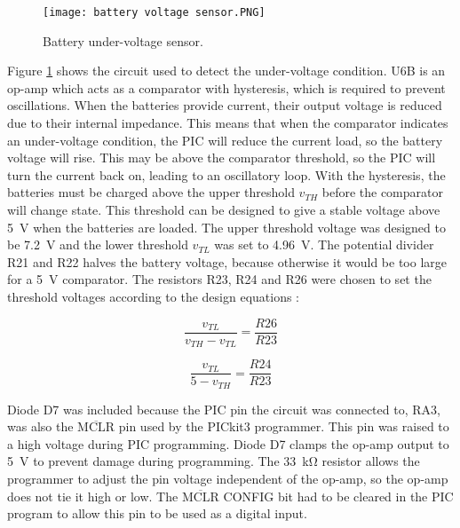 \begin{figure}[htb]
	\centering
	\texttt{[image: battery voltage sensor.PNG]}
	\caption{Battery under-voltage sensor.}
	\label{fig: battery voltage sensor}
\end{figure}

Figure \ref{fig: battery voltage sensor} shows the circuit used to detect the under-voltage condition. U6B is an op-amp which acts as a comparator with hysteresis, which is required to prevent oscillations. When the batteries provide current, their output voltage is reduced due to their internal impedance. This means that when the comparator indicates an under-voltage condition, the PIC will reduce the current load, so the battery voltage will rise. This may be above the comparator threshold, so the PIC will turn the current back on, leading to an oscillatory loop. With the hysteresis, the batteries must be charged above the upper threshold $v_{TH}$ before the comparator will change state. This threshold can be designed to give a stable voltage above \SI{5}{\volt} when the batteries are loaded. The upper threshold voltage was designed to be \SI{7.2}{\volt} and the lower threshold $v_{TL}$ was set to \SI{4.96}{\volt}. The potential divider R21 and R22 halves the battery voltage, because otherwise it would be too large for a \SI{5}{\volt} comparator. The resistors R23, R24 and R26 were chosen to set the threshold voltages according to the design equations \cite{hysteresis}:%
\begin{multicols}{2}
\begin{equation}
\frac{v_{TL}}{v_{TH} - v_{TL}} = \frac{R26}{R23}
\end{equation}

\begin{equation}
\frac{v_{TL}}{5 - v_{TH}} = \frac{R24}{R23}
\end{equation}
\end{multicols}

Diode D7 was included because the PIC pin the circuit was connected to, RA3, was also the $\overline{\text{MCLR}}$ pin used by the PICkit3 programmer. This pin was raised to a high voltage during PIC programming. Diode D7 clamps the op-amp output to \SI{5}{\volt} to prevent damage during programming. The \SI{33}{\kilo\ohm} resistor allows the programmer to adjust the pin voltage independent of the op-amp, so the op-amp does not tie it high or low. The $\overline{\text{MCLR}}$ CONFIG bit had to be cleared in the PIC program to allow this pin to be used as a digital input. \\

